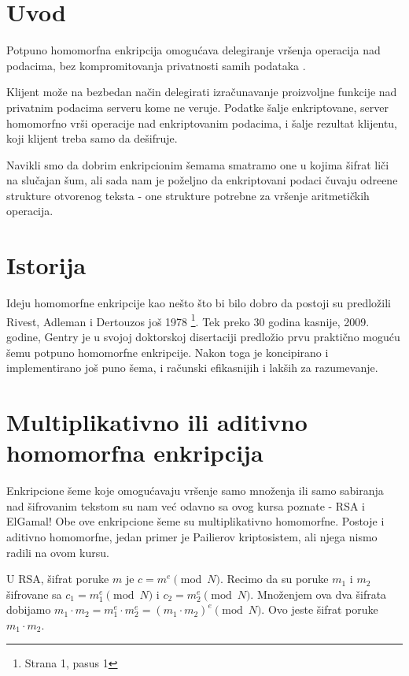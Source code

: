 
\section{Uvod}

Potpuno homomorfna enkripcija omogu\' cava delegiranje vr\v senja operacija nad podacima, bez kompromitovanja privatnosti samih podataka \cite{gentry2010computing}. 

Klijent mo\v ze na bezbedan na\v cin delegirati izra\v cunavanje proizvoljne funkcije nad privatnim podacima serveru kome ne veruje. Podatke \v salje enkriptovane, server homomorfno vr\v si operacije nad enkriptovanim podacima, i \v salje rezultat klijentu, koji klijent treba samo da de\v sifruje.

Navikli smo da dobrim enkripcionim \v semama smatramo one u kojima \v sifrat li\v ci na slu\v cajan \v sum, ali sada nam je po\v zeljno da enkriptovani podaci \v cuvaju odre\dj ene strukture otvorenog teksta - one strukture potrebne za vr\v senje aritmeti\v ckih operacija.

\section{Istorija}

Ideju homomorfne enkripcije kao ne\v sto \v sto bi bilo dobro da postoji su predlo\v zili  Rivest, Adleman i Dertouzos jo\v s 1978 \cite{marcolla2022survey} \footnote{Strana 1, pasus 1}. Tek preko 30 godina kasnije, 2009. godine, Gentry je u svojoj doktorskoj disertaciji predlo\v zio prvu prakti\v cno mogu\' cu \v semu potpuno homomorfne enkripcije. Nakon toga je koncipirano i implementirano jo\v s puno \v sema, i ra\v cunski efikasnijih i lak\v sih za razumevanje.


\section{Multiplikativno ili aditivno homomorfna enkripcija}

Enkripcione \v seme koje omogu\' cavaju vr\v senje samo mno\v zenja ili samo sabiranja nad \v sifrovanim tekstom su nam ve\' c odavno sa ovog kursa poznate - RSA i ElGamal! Obe ove enkripcione \v seme su multiplikativno homomorfne. Postoje i aditivno homomorfne, jedan primer je Pailierov kriptosistem, ali njega nismo radili na ovom kursu.

U RSA, \v sifrat poruke $m$ je $c=m^e\pmod{N}$. Recimo da su poruke $m_1$ i $m_2$ \v sifrovane sa $c_1 = m_1^e\pmod{N}$ i $c_2 = m_2^e\pmod{N}$. Mno\v zenjem ova dva \v sifrata dobijamo $m_1\cdot m_2 = m_1^e\cdot m_2^e = (m_1\cdot m_2)^e \pmod{N}$. Ovo jeste \v sifrat poruke $m_1\cdot m_2$.

